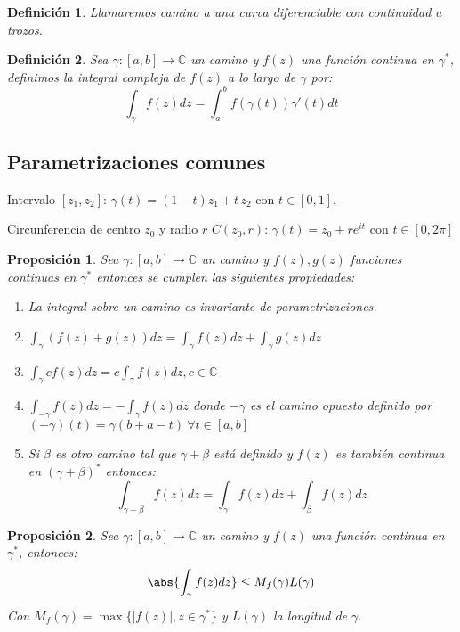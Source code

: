 \documentclass[10pt]{book}
\newtheorem{defi}{Definición}[chapter]
\newtheorem{prop}{Proposición}[chapter]
\newcommand{\C}{\mathbb{C}}
\begin{document}
\begin{defi}
Llamaremos camino a una curva diferenciable con continuidad a trozos.

\end{defi}

\begin{defi}
Sea  $\gamma:[a,b]\longrightarrow \C$ un camino y $f(z)$ una función continua en $\gamma^*$, definimos la integral compleja de $f(z)$ a lo largo de $\gamma$ por:
$$
\int_{\gamma} f(z) dz = \int_a^b f(\gamma(t)) \gamma'(t)dt
$$
\end{defi}

\subsection*{Parametrizaciones comunes}
Intervalo $[z_1,z_2]$: $\gamma(t) = (1-t)z_1 +t \, z_2$ con $t\in [0,1]$.

Circunferencia de centro $z_0$ y radio $r$ $C(z_0,r)$: $\gamma(t) = z_0 + re^{it}$ con $t\in[0,2\pi]$ 

\begin{prop}
Sea $\gamma:[a,b]\longrightarrow \C$ un camino y $f(z), g(z)$ funciones continuas en $\gamma^*$ entonces se cumplen las siguientes propiedades:
\begin{enumerate}
\item La integral sobre un camino es invariante de parametrizaciones.
\item $\int_\gamma (f(z)+g(z)) dz = \int_\gamma f(z)dz + \int_\gamma g(z) dz$
\item $\int_\gamma c f(z) dz = c \int_\gamma f(z) dz, c\in\C$
\item $\int_{-\gamma} f(z) dz = -\int_\gamma f(z) dz$ donde $-\gamma$ es el camino opuesto definido por $(-\gamma)(t) = \gamma(b+a-t) \ \forall t \in [a,b]$
\item Si $\beta$ es otro camino tal que $\gamma + \beta$ está definido y $f(z)$ es también continua en $(\gamma+\beta)^*$ entonces:
$$
\int_{\gamma+\beta}f(z)dz = \int_\gamma f(z)dz + \int_\beta f(z)dz
$$
\end{enumerate}
\end{prop}


\begin{prop}
Sea $\gamma:[a,b]\longrightarrow \C$ un camino y $f(z)$ una función continua en $\gamma^*$, entonces:
$$\abs{\int_\gamma f(z)dz }\leq M_f(\gamma)L(\gamma)$$
Con $M_f(\gamma) = \max \{|f(z)|,z \in \gamma^* \}$ y $L(\gamma)$ la longitud de $\gamma$.
\end{prop}
\end{document}
